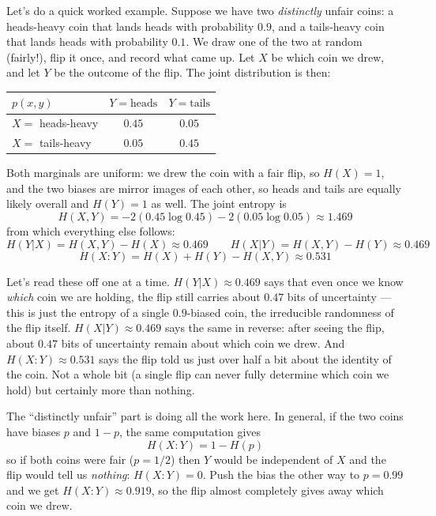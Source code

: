 \documentclass[a4paper,12pt]{article}
\begin{document}
Let's do a quick worked example.
Suppose we have two \emph{distinctly} unfair coins: a heads-heavy coin that lands heads with probability $0.9$, and a tails-heavy coin that lands heads with probability $0.1$.
We draw one of the two at random (fairly!), flip it once, and record what came up.
Let $X$ be which coin we drew, and let $Y$ be the outcome of the flip.
The joint distribution is then:
\begin{center}
    \begin{tabular}{@{} l c c @{}}
        \toprule
        $p(x,y)$ & $Y=\text{heads}$ & $Y=\text{tails}$ \\
        \midrule
        $X=$ heads-heavy & $0.45$ & $0.05$ \\
        $X=$ tails-heavy & $0.05$ & $0.45$ \\
        \bottomrule
    \end{tabular}
\end{center}
Both marginals are uniform: we drew the coin with a fair flip, so $H(X)=1$, and the two biases are mirror images of each other, so heads and tails are equally likely overall and $H(Y)=1$ as well.
The joint entropy is
$$H(X,Y) = -2\left(0.45\log 0.45\right) - 2\left(0.05\log 0.05\right) \approx 1.469$$
from which everything else follows:
$$H(Y|X) = H(X,Y) - H(X) \approx 0.469 \qquad H(X|Y) = H(X,Y) - H(Y) \approx 0.469$$
$$H(X:Y) = H(X) + H(Y) - H(X,Y) \approx 0.531$$

Let's read these off one at a time.
$H(Y|X)\approx0.469$ says that even once we know \emph{which} coin we are holding, the flip still carries about $0.47$ bits of uncertainty --- this is just the entropy of a single $0.9$-biased coin, the irreducible randomness of the flip itself.
$H(X|Y)\approx0.469$ says the same in reverse: after seeing the flip, about $0.47$ bits of uncertainty remain about which coin we drew.
And $H(X:Y)\approx0.531$ says the flip told us just over half a bit about the identity of the coin.
Not a whole bit (a single flip can never fully determine which coin we hold) but certainly more than nothing.

The ``distinctly unfair'' part is doing all the work here. In general, if the two coins have biases $p$ and $1-p$, the same computation gives
$$H(X:Y) = 1 - H(p)$$
so if both coins were fair ($p=1/2$) then $Y$ would be independent of $X$ and the flip would tell us \emph{nothing}: $H(X:Y)=0$.
Push the bias the other way to $p=0.99$ and we get $H(X:Y)\approx0.919$, so the flip almost completely gives away which coin we drew.
\end{document}
